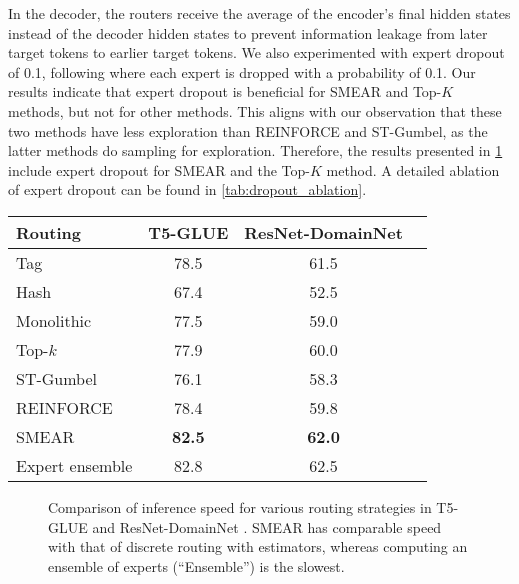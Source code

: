 \documentclass{article}
\theoremstyle{plain}
\theoremstyle{definition}
\theoremstyle{remark}
\begin{document}
In the decoder, the routers receive the average of the encoder's final hidden states instead of the decoder hidden states to prevent information leakage from later target tokens to earlier target tokens. 
We also experimented with expert dropout of 0.1, following \citet{komatsuzaki2022sparse} where each expert is dropped with a probability of 0.1.
Our results indicate that expert dropout is beneficial for SMEAR and Top-$K$ methods, but not for other methods. 
This aligns with our observation that these two methods have less exploration than REINFORCE and ST-Gumbel, as the latter methods do sampling for exploration.
Therefore, the results presented in \cref{tab:main} include expert dropout for SMEAR and the Top-$K$ method. 
A detailed ablation of expert dropout can be found in \cref{tab:dropout_ablation}.

\begin{table}[t]
\centering
\begin{tabular}{l c c c}
  \toprule
  Routing & T5-GLUE & ResNet-DomainNet\\
  \midrule
  Tag & 78.5 & 61.5 \\
  Hash & 67.4 & 52.5 \\
  Monolithic & 77.5 & 59.0 \\
  \midrule
  Top-$k$ & 77.9 & 60.0 \\
  ST-Gumbel & 76.1 & 58.3 \\
  REINFORCE & 78.4 & 59.8 \\  
  \midrule
  SMEAR & \textbf{82.5} & \textbf{62.0} \\
  \color{lightgray} Expert ensemble & \color{lightgray}82.8 & \color{lightgray}62.5 \\ 
  \bottomrule
\end{tabular}
\label{tab:main}
\end{table}

\begin{figure*}[htp]
\centering
{}
\caption{Comparison of inference speed for various routing strategies in T5-GLUE  and ResNet-DomainNet . SMEAR has comparable speed with that of discrete routing with estimators, whereas computing an ensemble of experts (``Ensemble'') is the slowest.}
\label{fig:speeds}
\end{figure*}
\end{document}
